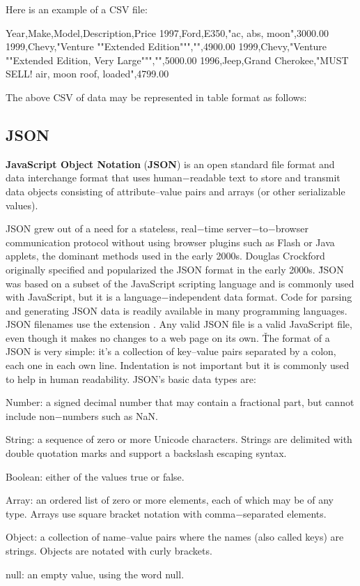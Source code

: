 Here is an example of a CSV file:

\begin{block}
Year,Make,Model,Description,Price
1997,Ford,E350,"ac, abs, moon",3000.00
1999,Chevy,"Venture ""Extended Edition""","",4900.00
1999,Chevy,"Venture ""Extended Edition, Very Large""","",5000.00
1996,Jeep,Grand Cherokee,"MUST SELL! air, moon roof, loaded",4799.00
\end{block}

The above CSV of data may be represented in table format as follows:


\subsection{JSON}


\textbf{JavaScript Object Notation} (\textbf{JSON}) is an open standard file format and data interchange format that
uses human$-$readable text to store and transmit data objects consisting of attribute–value pairs and arrays (or other
serializable values).
\ed

JSON grew out of a need for a stateless, real$-$time server$-$to$-$browser communication protocol without using
browser plugins such as Flash or Java applets, the dominant methods used in the early 2000s. Douglas Crockford
originally specified and popularized the JSON format in the early 2000s. \v

JSON was based on a subset of the JavaScript scripting language and is commonly used with JavaScript, but it is a
language$-$independent data format. Code for parsing and generating JSON data is readily available in many
programming languages. JSON filenames use the extension . Any valid JSON file is a valid JavaScript file,
even though it makes no changes to a web page on its own. \v

The format of a JSON is very simple: it's a collection of key–value pairs separated by a colon, each one in each own
line. Indentation is not important but it is commonly used to help in human readability. JSON's basic data types are:
\bit
\item Number: a signed decimal number that may contain a fractional part, but cannot include non$-$numbers such as NaN.
\item String: a sequence of zero or more Unicode characters. Strings are delimited with double quotation marks and
support a backslash escaping syntax.
\item Boolean: either of the values true or false.
\item Array: an ordered list of zero or more elements, each of which may be of any type. Arrays use square bracket
notation with comma$-$separated elements.
\item Object: a collection of name–value pairs where the names (also called keys) are strings. Objects are notated with
curly brackets.
\item null: an empty value, using the word null.
\eit

